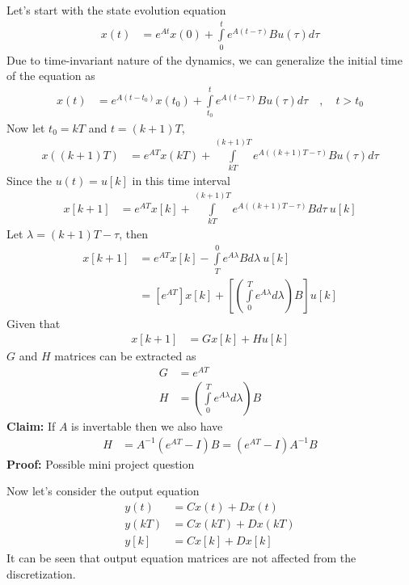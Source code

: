 \documentclass[twoside]{article}
\begin{document}
Let's start with the state evolution equation
%
\begin{align*}
  x(t) &= e^{A t} x(0) + \int\limits_{0}^{t} e^{A ( t - \tau ) } B
         u(\tau) d \tau
\end{align*}
%
Due to time-invariant nature of the dynamics, we can 
generalize the initial time of the equation as
%
\begin{align*}
  x(t) &= e^{A (t - t_0)} x(t_0) + \int\limits_{t_0}^{t} e^{A ( t - \tau ) } B
         u(\tau) d \tau \quad , \quad t > t_0
\end{align*}
%
Now let $t_0 = k T$ and $t = (k+1) T$,
%
\begin{align*}
  x( (k+1) T ) &= e^{A T} x(k T) + \int\limits_{kT}^{(k+1)T} e^{A ( (k+1)T - \tau ) } B
         u(\tau) d \tau 
\end{align*}
%
Since the $u(t) = u[k]$ in this time interval
%
\begin{align*}
  x[k+1] &= e^{A T} x[k] + \int\limits_{kT}^{(k+1)T} e^{A ( (k+1)T -
           \tau ) } B d \tau \ u[k]
\end{align*}
%
Let $\lambda = (k+1)T -\tau $, then
%
\begin{align*}
  x[k+1] &= e^{A T} x[k] - \int\limits_{T}^{0} e^{A \lambda } B d \lambda \ u[k]
\\
&= \left[ e^{A T} \right] x[k] + \left[\left( \int\limits_{0}^{T}
  e^{A \lambda } d \lambda \right) B \right] u[k]
\end{align*}
% 
Given that 
%
\begin{align*}
  x[k+1] &= G x[k] + H u[k]
\end{align*}
%
$G$ and $H$ matrices can be extracted as
%
\begin{align*}
  G &= e^{A T}
\\
 H &= \left( \int\limits_{0}^{T}
  e^{A \lambda } d \lambda \right) B
\end{align*}
%
\textbf{Claim:} If $A$ is invertable then we also have
%
\begin{align*}
 H &= A^{-1} \left( e^{AT} - I \right) B = \left( e^{AT} - I \right)
     A^{-1}  B  
\end{align*}
%
\textbf{Proof:} Possible mini project question

Now let's consider the output equation
%
%
\begin{align*}
  y(t) &= C x(t) + D x(t)
         \\
 y(k T) &= C x( k T) + D x( k T) 
\\
 y[k] &= C x[k] + D x[k] 
\end{align*}
%
It can be seen that output equation matrices are not affected from
the discretization.
\end{document}
